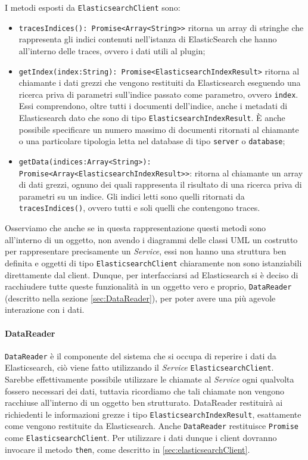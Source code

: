 I metodi esposti da \texttt{ElasticsearchClient} sono: 
\begin{itemize} 
  \item \texttt{tracesIndices(): Promise<Array<String>>} ritorna un array di stringhe che rappresenta gli indici contenuti nell'istanza di ElasticSearch che hanno all'interno delle traces, ovvero i dati utili al plugin; 
  \item \texttt{getIndex(index:String): Promise<ElasticsearchIndexResult>} ritorna al chiamante i dati grezzi che vengono restituiti da Elasticsearch eseguendo una ricerca priva di parametri sull'indice passato come parametro, ovvero \texttt{index}. Essi comprendono, oltre tutti i documenti dell'indice, anche i metadati di Elasticsearch dato che sono di tipo \texttt{ElasticsearchIndexResult}. È anche possibile specificare un numero massimo di documenti ritornati al chiamante o una particolare tipologia letta nel database di tipo \texttt{server} o \texttt{database}; 
  \item \texttt{getData(indices:Array<String>): Promise<Array<ElasticsearchIndexResult>>}: ritorna al chiamante un array di dati grezzi, ognuno dei quali rappresenta il risultato di una ricerca priva di parametri su un indice. Gli indici letti sono quelli ritornati da \texttt{tracesIndices()}, ovvero tutti e soli quelli che contengono traces. 
\end{itemize} 
Osserviamo che anche se in questa rappresentazione questi metodi sono all'interno di un oggetto, non avendo i diagrammi delle classi UML un costrutto per rappresentare precisamente un \emph{Service}, essi non hanno una struttura ben definita e oggetti di tipo \texttt{ElasticsearchClient} chiaramente non sono istanziabili direttamente dal client. Dunque, per interfacciarsi ad Elasticsearch si è deciso di racchiudere tutte queste funzionalità in un oggetto vero e proprio, \texttt{DataReader} (descritto nella sezione \ref{sec:DataReader}), per poter avere una più agevole interazione con i dati. 

\paragraph{DataReader} \Spazio
\label{sec:DataReader}
\texttt{DataReader} è il componente del sistema che si occupa di reperire i dati da Elasticsearch, ciò viene fatto utilizzando il \emph{Service} \texttt{ElasticsearchClient}. Sarebbe effettivamente possibile utilizzare le chiamate al \emph{Service} ogni qualvolta fossero necessari dei dati, tuttavia ricordiamo che tali chiamate non vengono racchiuse all'interno di un oggetto ben strutturato. DataReader restituirà ai richiedenti le informazioni grezze i tipo \texttt{ElasticsearchIndexResult}, esattamente come vengono restituite da Elasticsearch. Anche \texttt{DataReader} restituisce \texttt{Promise} come \texttt{ElasticsearchClient}. Per utilizzare i dati dunque i client dovranno invocare il metodo \texttt{then}, come descritto in \ref{sec:elasticsearchClient}.


